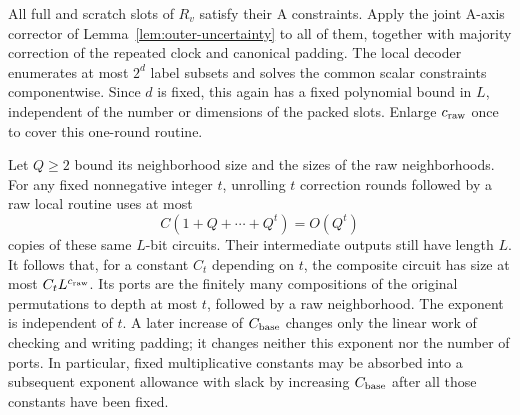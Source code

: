 All full and scratch slots of $R_v$ satisfy their A constraints. Apply
the joint A-axis corrector of Lemma~\ref{lem:outer-uncertainty} to all
of them, together with majority correction of the repeated clock and
canonical padding. The local decoder enumerates at most $2^d$ label
subsets and solves the common scalar constraints componentwise. Since
$d$ is fixed, this again has a fixed polynomial bound in $L$, independent
of the number or dimensions of the packed slots. Enlarge $c_{\rm raw}$
once to cover this one-round routine.

Let $Q\geq2$ bound its neighborhood size and the sizes of the raw
neighborhoods. For any fixed nonnegative integer $t$, unrolling $t$
correction rounds followed by a raw local routine uses at most
\begin{equation}\label{oe:fixed-interface-composition}
 C(1+Q+\cdots+Q^t)=O(Q^t)
\end{equation}
copies of these same $L$-bit circuits. Their intermediate outputs still
have length $L$. It follows that, for a constant $C_t$ depending on $t$,
the composite circuit has size at most $C_tL^{c_{\rm raw}}$. Its ports
are the finitely many compositions of the original permutations to depth
at most $t$, followed by a raw neighborhood. The exponent is independent
of $t$. A later increase of $C_{\rm base}$ changes only the linear work
of checking and writing padding; it changes neither this exponent nor
the number of ports. In particular, fixed multiplicative constants may
be absorbed into a subsequent exponent allowance with slack by increasing
$C_{\rm base}$ after all those constants have been fixed.


